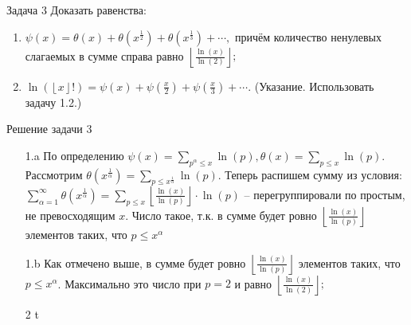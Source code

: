 \documentclass[a4paper,12pt]{article}
\newcommand{\TE}{\theta}
\newcommand{\AL}{\alpha}
\newcommand{\SI}{\psi}
\newcommand{\SL}{\sum\limits}
\begin{document}
\begin{mybox}{}
\end{mybox}

\begin{mybox}{}
\begin{task}{Задача 3}
Доказать равенства:
\begin{enumerate}
\item $\SI(x) = \TE(x) + \TE(x^\frac{1}{2}) + \TE(x^\frac{1}{3}) + \cdots,$ причём количество ненулевых слагаемых в сумме справа равно $\left\lfloor\frac{\ln(x)}{\ln(2)}\right\rfloor;$
\item $\ln(\left\lfloor x\right\rfloor!) = \SI(x) + \SI(\frac{x}{2}) + \SI(\frac{x}{3}) + \cdots.$ (Указание. Использовать задачу 1.2.)
\end{enumerate}
\end{task}
\begin{sol}{Решение задачи 3}
\begin{enumerate}
\item[1.a] По определению $\SI(x) = \SL_{p^\AL\le x}\ln(p), \TE(x) = \SL_{p\le x}\ln(p).$\\
Рассмотрим $\TE(x^\frac{1}{\AL}) = \SL_{p \le x^\frac{1}{\AL}} \ln(p)$. Теперь распишем сумму из условия: $\SL_{\AL = 1}^\infty  \TE(x^\frac{1}{\AL}) = \SL_{p \le x}  \left\lfloor \frac{\ln(x)}{\ln(p)}  \right\rfloor \cdot \ln(p)$ -- перегруппировали по простым, не превосходящим $x$. Число такое, т.к. в сумме будет ровно $\left\lfloor \frac{\ln(x)}{\ln(p)}  \right\rfloor$ элементов таких, что $p \le x^{\AL}$\\
\item[1.b] Как отмечено выше, в сумме будет ровно $\left\lfloor \frac{\ln(x)}{\ln(p)}  \right\rfloor$ элементов таких, что $p \le x^{\AL}$. Максимально это число при $p=2$ и равно  $\left\lfloor\frac{\ln(x)}{\ln(2)}\right\rfloor;$
\item[2\;] t
\end{enumerate}
\end{sol}
\end{mybox}
\end{document}
